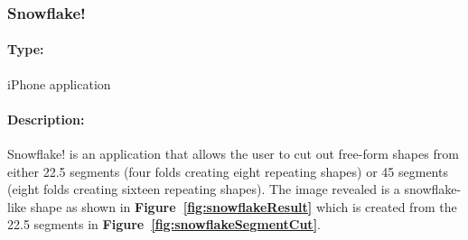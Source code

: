 \documentclass[11pt]{article}
\begin{document}
            \subsubsection{Snowflake!}
            
                \paragraph{Type:} iPhone application \cite{Snowflake}
            
                \paragraph{Description:}
                Snowflake! is an application that allows the user to cut out free-form shapes from either 22.5\textdegree{} segments (four folds creating eight repeating shapes) or 45\textdegree{} segments (eight folds creating sixteen repeating shapes). The image revealed is a snowflake-like shape as shown in \textbf{Figure~\ref{fig:snowflakeResult}} which is created from the 22.5\textdegree{} segments in \textbf{Figure~\ref{fig:snowflakeSegmentCut}}. 
                    
\end{document}
